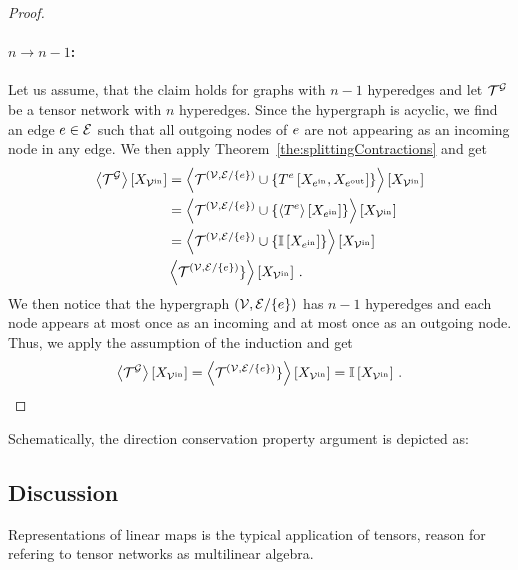 \begin{proof}
	\paragraph{$n\rightarrow n-1$:} Let us assume, that the claim holds for graphs with $n-1$ hyperedges and let $\mathcal{T}^{\mathcal{G}}$ be a tensor network with $n$ hyperedges.
	Since the hypergraph is acyclic, we find an edge $e\in\mathcal{E}$ such that all outgoing nodes of $e$ are not appearing as an incoming node in any edge. 
	We then apply Theorem~\ref{the:splittingContractions} and get
	\begin{align*}
		\left\langle \mathcal{T}^{\mathcal{G}}\right\rangle \left[ X_{\mathcal{V}^{\mathrm{in}}} \right] 
		&= \left\langle 
			\mathcal{T}^{(\mathcal{V},\mathcal{E}/\{e\})} \cup \{T^{e}\left[X_{e^{\mathrm{in}}},X_{e^{\mathrm{out}}}\right]\}
			\right\rangle \left[ X_{\mathcal{V}^{\mathrm{in}}} \right] \\
		& = \left\langle 
			\mathcal{T}^{(\mathcal{V},\mathcal{E}/\{e\})} \cup \{\left\langle T^{e}\right\rangle \left[ X_{e^{\mathrm{in}}} \right] \}
			\right\rangle \left[ X_{\mathcal{V}^{\mathrm{in}}} \right] \\
		& = \left\langle 
			\mathcal{T}^{(\mathcal{V},\mathcal{E}/\{e\})} \cup \{\mathbb{I}\left[X_{e^{\mathrm{in}}}\right] \}
			\right\rangle \left[ X_{\mathcal{V}^{\mathrm{in}}} \right] \\
		& \left\langle 
			\mathcal{T}^{(\mathcal{V},\mathcal{E}/\{e\})} \}
			\right\rangle \left[ X_{\mathcal{V}^{\mathrm{in}}} \right] \, . 
	\end{align*}
	We then notice that the hypergraph $(\mathcal{V},\mathcal{E}/\{e\})$ has $n-1$ hyperedges and each node appears at most once as an incoming and at most once as an outgoing node.
	Thus, we apply the assumption of the induction and get
	\begin{align*}
		\left\langle \mathcal{T}^{\mathcal{G}}\right\rangle \left[ X_{\mathcal{V}^{\mathrm{in}}} \right] = \left\langle 
			\mathcal{T}^{(\mathcal{V},\mathcal{E}/\{e\})} \}
			\right\rangle \left[ X_{\mathcal{V}^{\mathrm{in}}} \right] = \mathbb{I}\left[X_{\mathcal{V}^{\mathrm{in}}}\right] \, . 
	\end{align*}
	
\end{proof}


Schematically, the direction conservation property argument is depicted as:
\begin{center}
	
\end{center}






\subsection{Discussion}

Representations of linear maps is the typical application of tensors, reason for refering to tensor networks as multilinear algebra.
